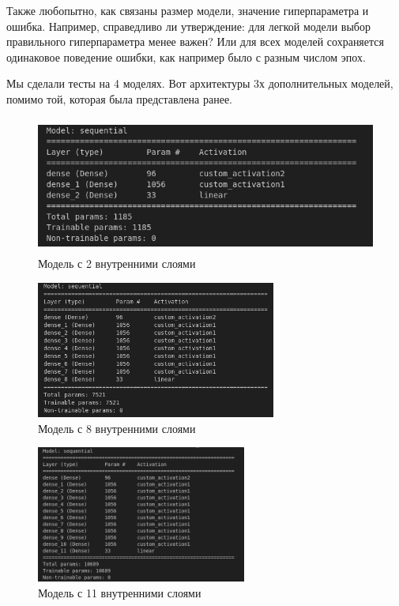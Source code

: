 \newpage

Также любопытно, как связаны размер модели, значение гиперпараметра и ошибка. Например, справедливо ли утверждение: для легкой модели выбор правильного гиперпараметра менее важен?
Или для всех моделей сохраняется одинаковое поведение ошибки, как например было с разным числом эпох.

Мы сделали тесты на 4 моделях. Вот архитектуры 3х дополнительных моделей, помимо той, которая была представлена ранее.

\begin{figure}[ht!]
    \centering
    \includegraphics[height=4.5cm, keepaspectratio]{images/16.png}
    \caption{Модель с 2 внутренними слоями}
\end{figure}

\begin{figure}[ht!]
    \centering
    \includegraphics[height=4.5cm, keepaspectratio]{images/17.png}
    \caption{Модель с 8 внутренними слоями}
\end{figure}

\begin{figure}[ht!]
    \centering
    \includegraphics[height=4.5cm, keepaspectratio]{images/18.png}
    \caption{Модель с 11 внутренними слоями}
\end{figure}

